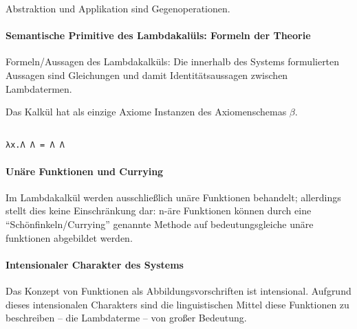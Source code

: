 Abstraktion und Applikation sind Gegenoperationen.

\paragraph{Semantische Primitive des Lambdakalüls: Formeln der Theorie}

Formeln/Aussagen des Lambdakalküls: %
Die innerhalb des Systems formulierten Aussagen sind Gleichungen und 
damit Identitätsaussagen zwischen Lambdatermen.

\begin{definition}

Das Kalkül hat als einzige Axiome Instanzen des Axiomenschemas $β$.

\begin{verbatim}

λx.Λ Λ = Λ Λ 

\end{verbatim}

\end{definition}



\paragraph{Unäre Funktionen und Currying}
Im Lambdakalkül werden ausschließlich unäre Funktionen behandelt;
allerdings stellt dies keine Einschränkung dar:
n-äre Funktionen können durch eine \enquote{Schönfinkeln/Currying}
genannte Methode auf bedeutungsgleiche unäre funktionen abgebildet werden. 




\paragraph{Intensionaler Charakter des Systems}
Das Konzept von Funktionen als Abbildungsvorschriften %
ist intensional.
Aufgrund dieses intensionalen Charakters sind die linguistischen Mittel 
diese Funktionen zu beschreiben -- die Lambdaterme -- von großer Bedeutung.


